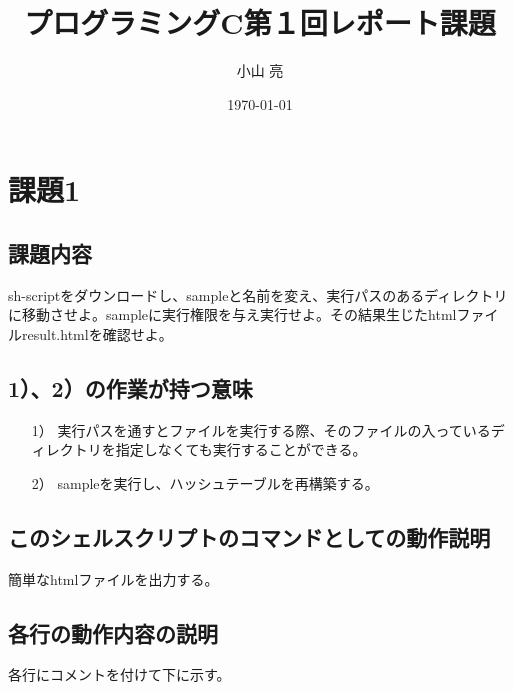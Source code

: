 \documentclass{procreport}
\title{プログラミングC第１回レポート課題}
\author{小山 亮}
\date{\today}
\begin{document}
\maketitle

\section{課題1}
\subsection{課題内容}
sh-scriptをダウンロードし、sampleと名前を変え、実行パスのあるディレクトリに移動させよ。sampleに実行権限を与え実行せよ。その結果生じたhtmlファイルresult.htmlを確認せよ。
\subsection{1）、2）の作業が持つ意味}
\begin{itemize}
\item[1）]実行パスを通すとファイルを実行する際、そのファイルの入っているディレクトリを指定しなくても実行することができる。
\item[2）]sampleを実行し、ハッシュテーブルを再構築する。
\end{itemize}
\subsection{このシェルスクリプトのコマンドとしての動作説明}
簡単なhtmlファイルを出力する。
\subsection{各行の動作内容の説明}
各行にコメントを付けて下に示す。
\end{document}
